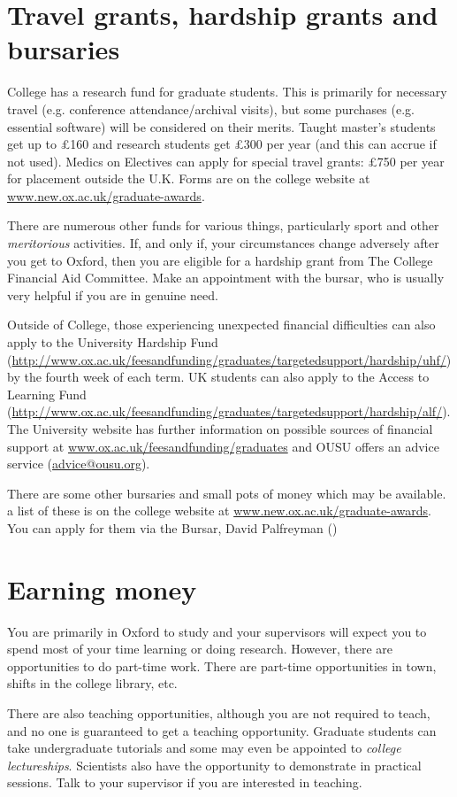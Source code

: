 \section[Grants and bursaries]{Travel grants, hardship grants and bursaries}
College has a research fund for graduate students. This is primarily for necessary travel (e.g. conference attendance/archival visits), but some purchases (e.g. essential software) will be considered on their merits. Taught master's students get up to \pounds160 and research students get \pounds300 per year (and this can accrue if not used). Medics on Electives can apply for special travel grants: \pounds750 per year for placement outside the U.K. Forms are on the college website at \url{www.new.ox.ac.uk/graduate-awards}.

There are numerous other funds for various things, particularly sport and other
\emph{meritorious} activities. If, and only if, your circumstances change
adversely after you get to Oxford, then you are eligible for a hardship grant from The College Financial Aid Committee. Make an appointment with the bursar, who is usually very helpful if you are in genuine need.

Outside of College, those experiencing unexpected financial difficulties can also apply to the University Hardship Fund (\url{http://www.ox.ac.uk/feesandfunding/graduates/targetedsupport/hardship/uhf/}) by the fourth week of each term. UK students can also apply to the Access to Learning Fund (\url{http://www.ox.ac.uk/feesandfunding/graduates/targetedsupport/hardship/alf/}). The University website has further information on possible sources of financial support at \url{www.ox.ac.uk/feesandfunding/graduates} and OUSU offers an advice service (\url{advice@ousu.org}).

There are some other bursaries and small pots of money which may be available. a list of these is on the college website at \url{www.new.ox.ac.uk/graduate-awards}. You can apply for them via the Bursar, David Palfreyman (\href{mailto:bursar@new.ox.ac.uk}{})

\section{Earning money}
You are primarily in Oxford to study and your supervisors will expect you to spend most of your time learning or doing research. However, there are opportunities to do part-time work. There are part-time opportunities in town, shifts in the college library, etc.

There are also teaching opportunities, although you are not required to teach,
and no one is guaranteed to get a teaching opportunity. Graduate students can
take undergraduate tutorials and some may even be appointed to \emph{college
lectureships}. Scientists also have the opportunity to demonstrate in practical sessions. Talk to your supervisor if you are interested in teaching.
